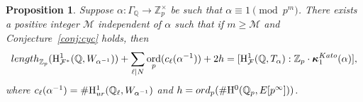 \documentclass[10pt,reqno]{amsart}
\numberwithin{equation}{section}
\theoremstyle{plain}
\theoremstyle{definition}
\newtheorem{rem}[thm]{Remark}
\theoremstyle{definition}
\theoremstyle{plain}
\newtheorem{prop}[thm]{Proposition}
\theoremstyle{plain}
\theoremstyle{plain}
\theoremstyle{plain}
\theoremstyle{plain}
\theoremstyle{plain}
\DeclareMathOperator{\ord}{ord}
\newcommand{\ind}{\operatorname{ind}}
\newcommand{\Z}{\mathbb{Z}}
\newcommand{\Q}{\mathbb{Q}}
\newcommand{\Zp}{\mathbb{Z}_{p}}
\newcommand{\X}{\mathfrak{X}}
\newcommand{\bkappa}{\boldsymbol{\kappa}}
\newcommand{\Fcal}{\mathcal{F}}
\newcommand{\rH}{\mathrm{H}}
\begin{document}




\begin{prop}\label{prop:control-alpha} 
Suppose $\alpha:\Gamma_\Q\rightarrow\Z_p^\times$ be such that $\alpha\equiv 1\pmod{p^m}$. There exists a positive integer $\mathcal{M}$ independent of $\alpha$ such that if $m\geq\mathcal{M}$ and Conjecture~\ref{conj:cyc} holds,  then 
\[
{\rm length}_{\Z_p}(\rH^1_{\Fcal^*}(\Q, W_{\alpha^{-1}}))+\sum_{\ell\mid N} \ord_p(c_\ell(\alpha^{-1}))+2h= [\rH^1_{\Fcal}(\Q,T_{\alpha}):\Zp\cdot\bkappa^{\rm Kato}_1(\alpha)],
\]
where $c_\ell(\alpha^{-1})=\#\rH^1_{\rm ur}(\Q_\ell,W_{\alpha^{-1}})$ and $h={\rm ord}_p(\#\rH^0(\Q_p,E[p^\infty]))$. 
\end{prop}

\end{document}
